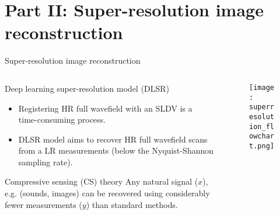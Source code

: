 \documentclass[10pt,aspectratio=169,dvipsnames]{beamer} %
\begin{document}
	\setcounter{subfigure}{0}
	\section{Part II: Super-resolution image reconstruction}
	\begin{frame}{Super-resolution image reconstruction}
		\begin{columns}[T]
			\begin{column}[t]{0.6\textwidth}
				\begin{alertblock}{Deep learning super-resolution model (DLSR)}					
					\begin{footnotesize}
						\justifying
						\begin{itemize}
							\item Registering HR full wavefield with an SLDV is a time-consuming process.
							\item DLSR model aims to recover HR full wavefield scans from a LR measurements (below the Nyquist-Shannon sampling rate).
						\end{itemize} 
					\end{footnotesize}					
				\end{alertblock}						
				\begin{exampleblock}{Compressive sensing (CS) theory}
					\footnotesize
					\justifying
					Any natural signal (\(x\)), e.g. (sounds, images) can be recovered using considerably fewer measurements (\(y\)) than standard methods.
					\vfill
					\centering
				\end{exampleblock}							
			\end{column}
			\begin{column}[t]{0.4\textwidth}
				\begin{figure}[ht!]
					\centering
					\texttt{[image: superresolution\_flowchart.png]}
				\end{figure}
			\end{column}
		\end{columns}		
	\end{frame}
\end{document}
